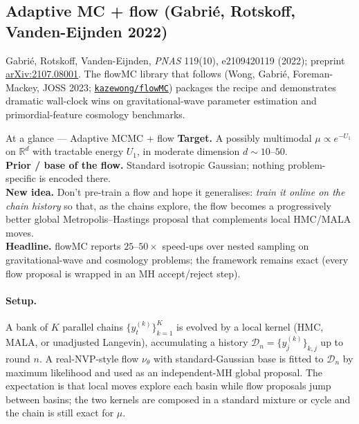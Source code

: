 \documentclass[11pt,letterpaper]{article}
\newcommand{\Real}{\mathbb{R}}
\theoremstyle{plain}
\begin{document}
\subsection{Adaptive MC + flow (Gabrié, Rotskoff, Vanden-Eijnden 2022)}

Gabrié, Rotskoff, Vanden-Eijnden, \emph{PNAS} 119(10), e2109420119 (2022);
preprint \href{https://arxiv.org/abs/2107.08001}{arXiv:2107.08001}. The
flowMC library that follows (Wong, Gabrié, Foreman-Mackey, JOSS 2023;
\href{https://github.com/kazewong/flowMC}{\texttt{kazewong/flowMC}}) packages the
recipe and demonstrates dramatic wall-clock wins on gravitational-wave parameter
estimation and primordial-feature cosmology benchmarks.

\begin{methodbox}{At a glance --- Adaptive MCMC + flow}
\textbf{Target.} A possibly multimodal $\mu\propto e^{-U_1}$ on $\Real^d$ with
tractable energy $U_1$, in moderate dimension $d\sim 10$--$50$.\\
\textbf{Prior / base of the flow.} Standard isotropic Gaussian; nothing
problem-specific is encoded there.\\
\textbf{New idea.} Don't pre-train a flow and hope it generalises: \emph{train it
online on the chain history} so that, as the chains explore, the flow becomes a
progressively better global Metropolis--Hastings proposal that complements local
HMC/MALA moves.\\
\textbf{Headline.} flowMC reports $25$--$50\times$ speed-ups over nested
sampling on gravitational-wave and cosmology problems; the framework remains
exact (every flow proposal is wrapped in an MH accept/reject step).
\end{methodbox}

\paragraph{Setup.} A bank of $K$ parallel chains $\{y^{(k)}_t\}_{k=1}^K$ is
evolved by a local kernel (HMC, MALA, or unadjusted Langevin), accumulating a
history $\mathcal D_n=\{y^{(k)}_{j}\}_{k,j}$ up to round $n$. A
real-NVP-style flow $\nu_\theta$ with standard-Gaussian base is fitted to
$\mathcal D_n$ by maximum likelihood and used as an independent-MH global
proposal. The expectation is that local moves explore each basin while flow
proposals jump between basins; the two kernels are composed in a standard
mixture or cycle and the chain is still exact for $\mu$.
\end{document}
